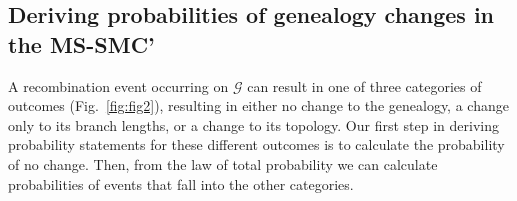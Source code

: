 \documentclass[11pt]{article}
\begin{document}
\subsection{Deriving probabilities of genealogy changes in the MS-SMC'}
A recombination event occurring on $\mathcal{G}$ can result in one of 
three categories of outcomes (Fig.~\ref{fig:fig2}), resulting in either 
no change to the genealogy, a change only to its branch lengths, 
or a change to its topology. Our first step in deriving probability statements for
these different outcomes is to calculate the probability of no change. Then, from
the law of total probability we can calculate probabilities of events that 
fall into the other categories.
\end{document}
